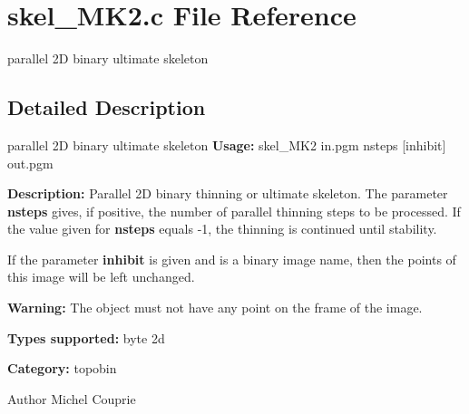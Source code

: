 \section{skel\_\-MK2.c File Reference}
\label{skel__MK2_8c}


parallel 2D binary ultimate skeleton  




\subsection{Detailed Description}
parallel 2D binary ultimate skeleton {\bfseries Usage:} skel\_\-MK2 in.pgm nsteps [inhibit] out.pgm

{\bfseries Description:} Parallel 2D binary thinning or ultimate skeleton. The parameter {\bfseries nsteps} gives, if positive, the number of parallel thinning steps to be processed. If the value given for {\bfseries nsteps} equals -\/1, the thinning is continued until stability.

If the parameter {\bfseries inhibit} is given and is a binary image name, then the points of this image will be left unchanged.

{\bfseries Warning:} The object must not have any point on the frame of the image.

{\bfseries Types supported:} byte 2d

{\bfseries Category:} topobin

\begin{DoxyAuthor}{Author}
Michel Couprie 
\end{DoxyAuthor}
